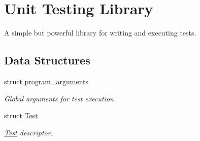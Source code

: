 \hypertarget{group__Testing}{}\section{Unit Testing Library}
\label{group__Testing}


A simple but powerful library for writing and executing tests.  


\subsection*{Data Structures}
\begin{DoxyCompactItemize}
\item 
struct \hyperlink{structprogram__arguments}{program\+\_\+arguments}
\begin{DoxyCompactList}\small\item\em Global arguments for test execution. \end{DoxyCompactList}\item 
struct \hyperlink{structTest}{Test}
\begin{DoxyCompactList}\small\item\em \hyperlink{structTest}{Test} descriptor. \end{DoxyCompactList}\end{DoxyCompactItemize}
